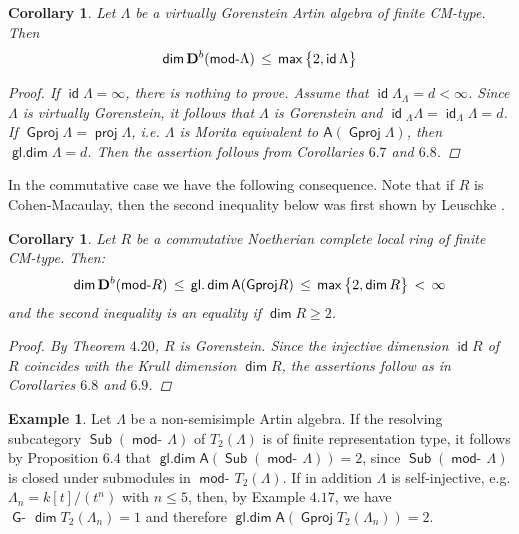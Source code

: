 \documentclass[oneside, a4paper,reqno]{amsart}
\numberwithin{equation}{section}
\newtheorem{cor}[thm]{Corollary}
\theoremstyle{definition}
\newtheorem{exam}[thm]{Example}
\begin{document}
\begin{cor} Let $\Lambda$ be a virtually Gorenstein Artin algebra of finite CM-type. Then
\[
\operatorname*{\mathsf{dim}}{\bf D}^{b}(\operatorname*{\mathsf{mod}-\!}\Lambda) \, \leq \, \operatorname*{\mathsf{max}}\big\{2,\operatorname*{\mathsf{id}}\Lambda\big\}
\]
\begin{proof} If $\operatorname*{\mathsf{id}}\Lambda = \infty$, there is nothing to prove.
Assume that $\operatorname*{\mathsf{id}}\Lambda_{\Lambda} = d < \infty$. Since $\Lambda$ is
virtually Gorenstein, it follows that $\Lambda$ is Gorenstein
and $\operatorname*{\mathsf{id}}{_{\Lambda}}\Lambda = \operatorname*{\mathsf{id}}_{\Lambda}\Lambda = d$. If
${\operatorname{\mathsf{Gproj}}\nolimits}\Lambda = \operatorname*{\mathsf{proj}}\Lambda$, i.e. $\Lambda$ is Morita equivalent
to $\mathsf{A}({\operatorname{\mathsf{Gproj}}\nolimits}\Lambda)$, then $\operatorname*{\mathsf{gl.dim}}\Lambda = d$. Then the
assertion follows from Corollaries $6.7$ and $6.8$.
\end{proof}
\end{cor}

In the commutative case we have the following consequence. Note that
if $R$ is Cohen-Macaulay, then the second inequality below was first
shown by Leuschke \cite{Leuschke}.

\begin{cor} Let $R$ be a commutative Noetherian complete local ring
of finite CM-type. Then:
\[
\operatorname*{\mathsf{dim}}{\bf D}^{b}(\operatorname*{\mathsf{mod}-\!} R) \, \leq \, \operatorname*{\mathsf{gl.dim}}\mathsf{A}({\operatorname{\mathsf{Gproj}}\nolimits} R) \, \leq
\,  \operatorname*{\mathsf{max}}\big\{2,\operatorname*{\mathsf{dim}} R\big\}\,  < \, \infty
\]
and the second inequality is an equality if $\operatorname*{\mathsf{dim}} R \geq 2$.
\begin{proof} By Theorem $4.20$, $R$ is Gorenstein. Since the injective dimension $\operatorname*{\mathsf{id}} R$ of $R$ coincides with the
Krull dimension $\operatorname*{\mathsf{dim}} R$, the assertions follow as in Corollaries
$6.8$ and $6.9$.
\end{proof}
\end{cor}

\begin{exam} Let $\Lambda$ be a non-semisimple Artin algebra. If the resolving
subcategory  $\operatorname*{\mathsf{Sub}}(\operatorname*{\mathsf{mod}-\!}\Lambda)$ of $T_{2}(\Lambda)$ is of finite
representation type, it follows by Proposition $6.4$ that
$\operatorname*{\mathsf{gl.dim}}\mathsf{A}(\operatorname*{\mathsf{Sub}}(\operatorname*{\mathsf{mod}-\!}\Lambda)) = 2$, since $\operatorname*{\mathsf{Sub}}(\operatorname*{\mathsf{mod}-\!}\Lambda)$
is closed under submodules in $\operatorname*{\mathsf{mod}-\!} T_{2}(\Lambda)$.  If in
addition $\Lambda$ is self-injective, e.g. $\Lambda_{n} =
k[t]/(t^{n})$ with $n \leq 5$, then, by Example $4.17$, we have
$\operatorname*{\mathsf{G}-\!}\operatorname*{\mathsf{dim}} T_{2}(\Lambda_{n}) = 1$ and therefore
$\operatorname*{\mathsf{gl.dim}}\mathsf{A}({\operatorname{\mathsf{Gproj}}\nolimits} T_{2}(\Lambda_{n})) = 2$.
\end{exam}
\end{document}
